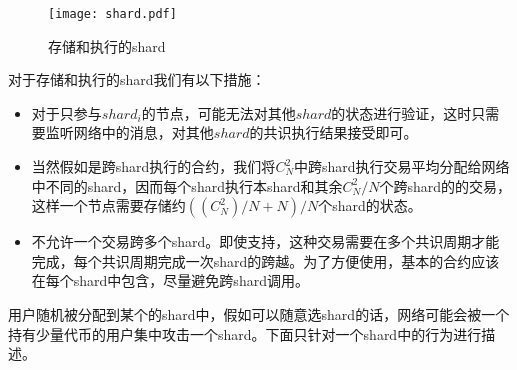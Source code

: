 \documentclass[12pt, UTF8]{article}
\begin{document}
\begin{figure}[!thb]
\centering
    \texttt{[image: shard.pdf]}
    \caption{存储和执行的shard}
    \label{fig:shard}
\end{figure}

对于存储和执行的shard我们有以下措施：
\begin{itemize}
\item 对于只参与$shard_i$的节点，可能无法对其他$shard$的状态进行验证，这时只需要监听网络中的消息，对其他$shard$的共识执行结果接受即可。
\item 当然假如是跨shard执行的合约，我们将$C^2_N$中跨shard执行交易平均分配给网络中不同的shard，因而每个shard执行本shard和其余$C^2_N/N$个跨shard的的交易，这样一个节点需要存储约$((C^2_N)/N+N)/N$个shard的状态。
\item 不允许一个交易跨多个shard。即使支持，这种交易需要在多个共识周期才能完成，每个共识周期完成一次shard的跨越。为了方便使用，基本的合约应该在每个shard中包含，尽量避免跨shard调用。
\end{itemize}


用户随机被分配到某个的shard中，假如可以随意选shard的话，网络可能会被一个持有少量代币的用户集中攻击一个shard\cite{dattack}。下面只针对一个shard中的行为进行描述。
\end{document}
